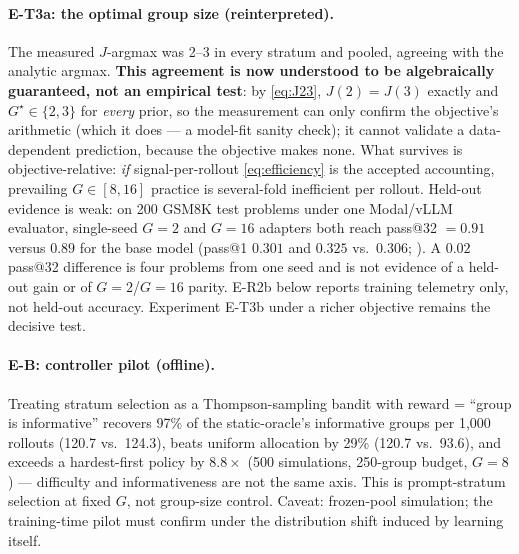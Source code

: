 \documentclass[11pt]{article}
\theoremstyle{plain}
\theoremstyle{definition}
\theoremstyle{remark}
\newcommand{\1}{\mathbb{1}}
\begin{document}
\paragraph{E-T3a: the optimal group size (reinterpreted).} The measured
$J$-argmax was 2--3 in every stratum and pooled, agreeing with the
analytic argmax. \textbf{This agreement is now understood to be
algebraically guaranteed, not an empirical test}: by \eqref{eq:J23},
$J(2)=J(3)$ exactly and $G^\star\in\{2,3\}$ for \emph{every} prior, so
the measurement can only confirm the objective's arithmetic (which it
does --- a model-fit sanity check); it cannot validate a data-dependent
prediction, because the objective makes none. What survives is
objective-relative: \emph{if} signal-per-rollout \eqref{eq:efficiency}
is the accepted accounting, prevailing $G\in[8,16]$ practice is
several-fold inefficient per rollout. Held-out evidence is weak: on 200
GSM8K test problems under one Modal/vLLM evaluator, single-seed $G{=}2$ and
$G{=}16$ adapters both reach pass@32 $=0.91$ versus $0.89$ for the base model
(pass@1 $0.301$ and $0.325$ vs.\ $0.306$;
). A $0.02$ pass@32
difference is four problems from one seed and is not evidence of a held-out
gain or of $G{=}2$/$G{=}16$ parity. E-R2b below reports training telemetry
only, not held-out accuracy. Experiment E-T3b under a richer objective remains
the decisive test.

\paragraph{E-B: controller pilot (offline).} Treating stratum selection as
a Thompson-sampling bandit with reward = ``group is informative'' recovers
97\% of the static-oracle's informative groups per 1{,}000 rollouts
(120.7 vs.\ 124.3), beats uniform allocation by 29\% (120.7 vs.\ 93.6), and
exceeds a hardest-first policy by $8.8\times$ (500 simulations, 250-group
budget, $G{=}8$) --- difficulty and informativeness are not the same axis.
This is prompt-stratum selection at fixed $G$, not group-size control.
Caveat: frozen-pool simulation;
the training-time pilot must confirm under the distribution shift induced
by learning itself.
\end{document}
